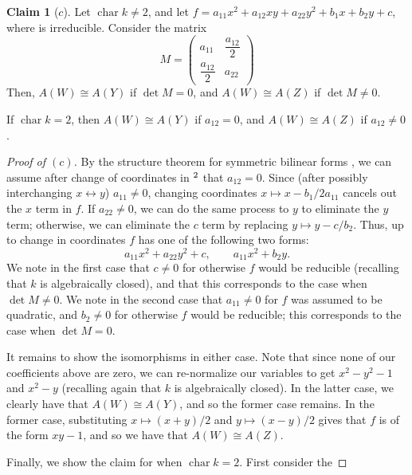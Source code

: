 \documentclass[10pt]{article}
\theoremstyle{definition}
\newtheorem*{claim}{Claim}
\theoremstyle{remark}
\numberwithin{equation}{section}
\numberwithin{figure}{subsubsection}
\let\AA\relax
\DeclareMathOperator{\AA}{\mathbf{A}}
\DeclareMathOperator{\Char}{char}
\begin{document}
\begin{claim}[$c$]
  Let $\Char k \ne 2$, and let
  $f = a_{11}x^2 + a_{12}xy + a_{22}y^2 + b_1x + b_2y + c$,
  where is irreducible. Consider the matrix
  \begin{equation*}
    M = \begin{pmatrix}
      a_{11} & \dfrac{a_{12}}{2}\\
      \dfrac{a_{12}}{2} & a_{22}
    \end{pmatrix}
  \end{equation*}
  Then, $A(W) \cong A(Y)$ if $\det M = 0$, and $A(W) \cong A(Z)$ if
  $\det M \ne 0$.
  \par If $\Char k =2$, then $A(W) \cong A(Y)$ if $a_{12} = 0$, and
  $A(W) \cong A(Z)$ if $a_{12} \ne 0$.
\end{claim}
\begin{proof}[Proof of $(c)$]
  By the structure theorem for symmetric bilinear forms
  \cite[Ch.~XV, Thm.~3.1]{Lan02}, we can assume after change of coordinates
  in $\AA^2$ that $a_{12} = 0$.
  Since (after possibly interchanging $x \leftrightarrow y$) $a_{11} \ne 0$,
  changing coordinates $x \mapsto x - b_1/2a_{11}$ cancels out the $x$ term in
  $f$.
  If $a_{22} \ne 0$, we can do the same process to $y$ to eliminate the $y$
  term; otherwise, we can eliminate the $c$ term by replacing
  $y \mapsto y - c/b_2$.
  Thus, up to change in coordinates $f$ has one of the following two forms:
  \begin{equation*}
    a_{11}x^2 + a_{22}y^2 + c, \qquad a_{11}x^2 + b_2y.
  \end{equation*}
  We note in the first case that $c \ne 0$ for otherwise $f$ would be
  reducible (recalling that $k$ is algebraically closed), and that this
  corresponds to the case when $\det M \ne 0$.
  We note in the second case that $a_{11} \ne 0$ for $f$ was assumed to be
  quadratic, and $b_2 \ne 0$ for otherwise $f$ would be reducible; this
  corresponds to the case when $\det M = 0$.
  \par It remains to show the isomorphisms in either case.
  Note that since none of our coefficients above are zero, we can re-normalize
  our variables to get $x^2 - y^2 - 1$ and $x^2 - y$ (recalling again that $k$
  is algebraically closed).
  In the latter case, we clearly have that $A(W) \cong A(Y)$, and so the former
  case remains.
  In the former case, substituting $x \mapsto (x+y)/2$ and $y \mapsto (x-y)/2$
  gives that $f$ is of the form $xy - 1$, and so we have that $A(W) \cong A(Z)$.
  \par Finally, we show the claim for when $\Char k = 2$. First consider the

\end{proof}
\end{document}
